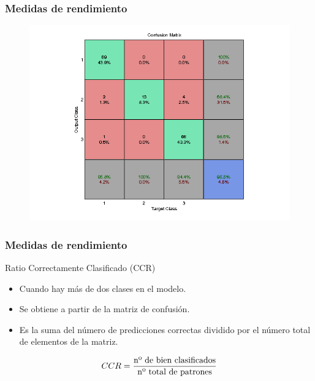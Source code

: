 \documentclass[compress,allowframebreaks]{beamer}
\begin{document}
			\begin{frame}
				\frametitle{\normalsize Medidas de rendimiento}
				
				\begin{figure}[h]
					\centering
					\includegraphics[scale=0.5]{img/mc.png}
				\end{figure}
			\end{frame}
			
			\begin{frame}
				\frametitle{\normalsize Medidas de rendimiento}
				
				\begin{block}{Ratio Correctamente Clasificado (CCR)}
					\begin{itemize}\justifying
						\item \small Cuando hay más de dos clases en el modelo.
						\item \small Se obtiene a partir de la matriz de confusión.
						\item \small Es la suma del número de predicciones correctas dividido por el número total de elementos de la matriz.
					\end{itemize}
					
					\begin{equation}
						\centering
						CCR = \frac{\text{nº de bien clasificados}}{\text{nº total de patrones}} \nonumber
					\end{equation}
				\end{block}
			\end{frame}
				
\end{document}
